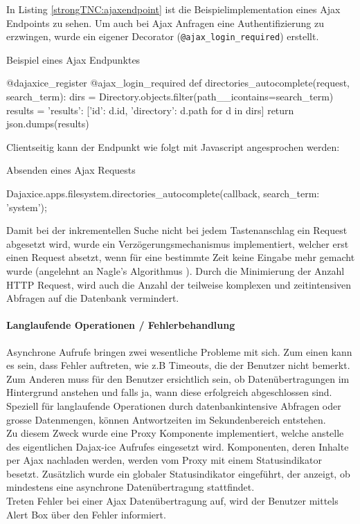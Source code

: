 In Listing \ref{strongTNC:ajaxendpoint} ist die Beispielimplementation eines Ajax Endpoints zu sehen. Um auch bei Ajax Anfragen eine Authentifizierung zu erzwingen, wurde ein eigener Decorator (\texttt{@ajax\_login\_required}) erstellt. 
\begin{listing}
\caption{Beispiel eines Ajax Endpunktes}
\label{strongTNC:ajaxendpoint}
\begin{pythoncode}
@dajaxice_register
@ajax_login_required
def directories_autocomplete(request, search_term):
    dirs = Directory.objects.filter(path__icontains=search_term)
    results = {'results': [{'id': d.id, 'directory': d.path} for d in dirs]}
    return json.dumps(results)
\end{pythoncode}
\end{listing}

Clientseitig kann der Endpunkt wie folgt mit Javascript angesprochen werden:
\begin{listing}
\caption{Absenden eines Ajax Requests}
\begin{jscode}
Dajaxice.apps.filesystem.directories_autocomplete(callback, {search_term: 'system'});
\end{jscode} 
\end{listing}

Damit bei der inkrementellen Suche nicht bei jedem Tastenanschlag ein Request
abgesetzt wird, wurde ein Verzögerungsmechanismus implementiert, welcher erst einen Request
absetzt, wenn für eine bestimmte Zeit keine Eingabe mehr gemacht wurde (angelehnt an Nagle's Algorithmus \cite{nagle1984congestion}).
Durch die Minimierung der Anzahl HTTP Request, wird auch die Anzahl der teilweise komplexen und zeitintensiven Abfragen auf die Datenbank vermindert.

\paragraph{Langlaufende Operationen / Fehlerbehandlung} Asynchrone Aufrufe
bringen zwei wesentliche Probleme mit sich. Zum einen kann es sein, dass Fehler
auftreten, wie z.B Timeouts, die der Benutzer nicht bemerkt. Zum Anderen muss
für den Benutzer ersichtlich sein, ob Datenübertragungen im Hintergrund anstehen
und falls ja, wann diese erfolgreich abgeschlossen sind. Speziell für
langlaufende Operationen durch datenbankintensive Abfragen oder grosse
Datenmengen, können Antwortzeiten im Sekundenbereich entstehen. \\ Zu diesem
Zweck wurde eine Proxy Komponente \cite{gamma1994design} implementiert, welche
anstelle des eigentlichen Dajax-ice Aufrufes eingesetzt wird. Komponenten, deren
Inhalte per Ajax nachladen werden, werden vom Proxy mit einem Statusindikator
besetzt. Zusätzlich wurde ein globaler Statusindikator eingeführt, der anzeigt,
ob mindestens eine asynchrone Datenübertragung stattfindet.\\ Treten Fehler bei
einer Ajax Datenübertragung auf, wird der Benutzer mittels Alert Box über den
Fehler informiert.

